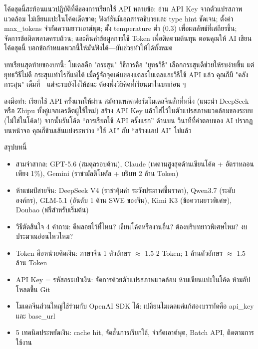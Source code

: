 โค้ดชุดนี้สะท้อนแนวปฏิบัติที่ดีของการเรียกใช้ API หลายข้อ: อ่าน API Key จากตัวแปรสภาพแวดล้อม ไม่เขียนแปะในโค้ดเด็ดขาด; ฟังก์ชันมีเอกสารอธิบายและ type hint ชัดเจน; ตั้งค่า max\_tokens จำกัดความยาวเอาต์พุต; ตั้ง temperature ต่ำ (0.3) เพื่อผลลัพธ์ที่เสถียรขึ้น; จัดการข้อผิดพลาดครบถ้วน; และคืนค่าข้อมูลการใช้ Token เพื่อติดตามต้นทุน ตอนคุณให้ AI เขียนโค้ดชุดนี้ บอกข้อกำหนดพวกนี้ให้มันฟังได้—มันช่วยทำให้ได้ทั้งหมด

บทเรียนสุดท้ายของบทนี้: โมเดลคือ "กระสุน" วิธีการคือ "ยุทธวิธี" เลือกกระสุนดีช่วยให้รบง่ายขึ้น แต่ยุทธวิธีไม่ดี กระสุนเท่าไรก็แพ้ได้ เมื่อรู้จักจุดเด่นของแต่ละโมเดลและวิธีใช้ API แล้ว คุณก็มี "คลังกระสุน" เต็มที่—แต่จะรบยังไงให้ชนะ ต้องพึ่งวิธีคิดที่เรียนมาในบทก่อน ๆ

\begin{tcbpractice}{ลงมือทำ: เรียกใช้ API ครั้งแรกให้ผ่าน}
สมัครแพลตฟอร์มโมเดลจีนสักที่หนึ่ง (แนะนำ DeepSeek หรือ Zhipu ทั้งคู่แจกเครดิตผู้ใช้ใหม่) สร้าง API Key แล้วใส่ไว้ในตัวแปรสภาพแวดล้อมของระบบ (ไม่ใช่ในโค้ด!) จากนั้นรันโค้ด “การเรียกใช้ API ครั้งแรก” ด้านบน วินาทีที่คำตอบของ AI ปรากฏบนหน้าจอ คุณก็ข้ามเส้นแบ่งระหว่าง “ใช้ AI” กับ “สร้างแอป AI” ไปแล้ว

\end{tcbpractice}

\begin{tcbsummary}{สรุปบทนี้}
\begin{itemize}
  \item สามจ่าสากล: GPT-5.6 (สมดุลรอบด้าน), Claude (เพดานสูงสุดด้านเขียนโค้ด + อัตราหลอนเพียง 1\%), Gemini (ราชามัลติโมดัล + บริบท 2 ล้าน Token)
  \item ห้าแชมป์สายจีน: DeepSeek V4 (ราชาคุ้มค่า ระวังประกาศขึ้นราคา), Qwen3.7 (ระดับองค์กร), GLM-5.1 (อันดับ 1 ด้าน SWE ของจีน), Kimi K3 (ข้อความยาวพิเศษ), Doubao (ฟรีสำหรับเริ่มต้น)
  \item วิธีตัดสินใจ 4 คำถาม: ดีพลอยไว้ที่ไหน? เขียนโค้ดหรืองานอื่น? ต้องบริบทยาวพิเศษไหม? งบประมาณอ่อนไหวไหม?
  \item Token คือหน่วยคิดเงิน: ภาษาจีน 1 ตัวอักษร $\approx$ 1.5-2 Token; 1 ล้านตัวอักษร $\approx$ 1.5 ล้าน Token
  \item API Key = รหัสกระเป๋าเงิน: จัดการด้วยตัวแปรสภาพแวดล้อม ห้ามเขียนแปะในโค้ด ห้ามอัปโหลดขึ้น Git
  \item โมเดลจีนส่วนใหญ่ใช้ร่วมกับ OpenAI SDK ได้: เปลี่ยนโมเดลแค่แก้สองบรรทัดคือ api\_key และ base\_url
  \item 5 เทคนิคประหยัดเงิน: cache hit, จัดชั้นการเรียกใช้, จำกัดเอาต์พุต, Batch API, ติดตามการใช้งาน
\end{itemize}

\end{tcbsummary}

